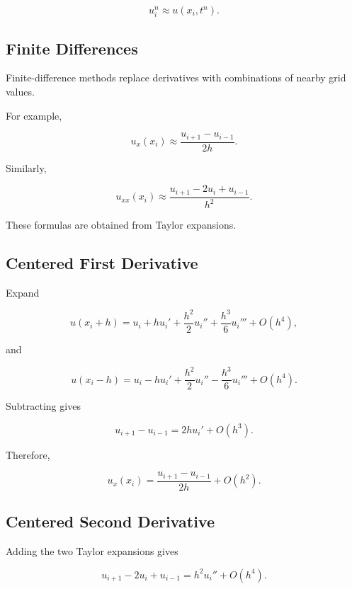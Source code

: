 \[
\boxed{
u_i^n
\approx
u(x_i,t^n).
}
\]

\subsection{Finite Differences}
\label{subsec:pde-finite-differences}

Finite-difference methods replace derivatives with combinations of nearby
grid values.

For example,

\[
\boxed{
u_x(x_i)
\approx
\frac{
u_{i+1}-u_{i-1}
}{
2h
}.
}
\]

Similarly,

\[
\boxed{
u_{xx}(x_i)
\approx
\frac{
u_{i+1}-2u_i+u_{i-1}
}{
h^2
}.
}
\]

These formulas are obtained from Taylor expansions.

\subsection{Centered First Derivative}
\label{subsec:pde-centered-first-derivative}

Expand

\[
u(x_i+h)
=
u_i
+
hu_i'
+
\frac{h^2}{2}u_i''
+
\frac{h^3}{6}u_i'''
+
O(h^4),
\]

and

\[
u(x_i-h)
=
u_i
-
hu_i'
+
\frac{h^2}{2}u_i''
-
\frac{h^3}{6}u_i'''
+
O(h^4).
\]

Subtracting gives

\[
u_{i+1}-u_{i-1}
=
2hu_i'
+
O(h^3).
\]

Therefore,

\[
\boxed{
u_x(x_i)
=
\frac{
u_{i+1}-u_{i-1}
}{
2h
}
+
O(h^2).
}
\]

\subsection{Centered Second Derivative}
\label{subsec:pde-centered-second-derivative}

Adding the two Taylor expansions gives

\[
u_{i+1}
-
2u_i
+
u_{i-1}
=
h^2u_i''
+
O(h^4).
\]

